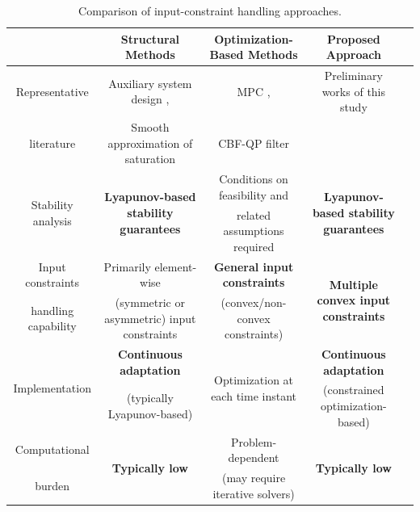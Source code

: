 \documentclass[letterpaper, journal]{IEEEtran}
\begin{document}


\begin{table}[t]
  \renewcommand{\arraystretch}{1.3}
  \caption{
    Comparison of input-constraint handling approaches.
  }
  \centering
  \begin{tabular}{c c c c c }
  \hline
  & 
  \textbf{Structural Methods} 
  & 
  \textbf{Optimization-Based Methods} 
  & 
  \textbf{Proposed Approach}
  \\
  \hline
  \hline %
    Representative 
  & 
  Auxiliary system design \cite{Gao:2017aa,Ma:2025aa,Gao:2026aa,Yang:2021aa,Jia:2020aa,Liu:2024aa,Liu:2025aa,Esfandiari:2014aa,Esfandiari:2015aa,Yu:2022aa,Rezaei:2025aa,He:2016aa,He:2019aa,Zhao:2016aa,Peng:2020aa},
  &
  MPC \cite{Greune:2011aa,Bemporad:1999aa,Berberich:2025aa,Draeger:1995aa,Vahidi-Moghaddam:2025aa,Mallick:2025aa,Khodaverdian:2025aa},
  &
  Preliminary works of this study
  \\
  literature
  &
  Smooth approximation of saturation \cite{Wang:2013aa,Cui:2014aa,Li:2024aa}
  &
  CBF-QP filter \cite{Ames:2019aa,Ko:2025aa,Sweatland:2025aa}
  &
  \cite{Ryu:2025ab,Ryu:2025aa}
  \\
  \hline %
  \multirow{2}{*}{
    Stability analysis 
  }
  & 
  \multirow{2}{*}{
    \textbf{Lyapunov-based stability guarantees}
  }
  & 
  Conditions on feasibility and
  & 
  \multirow{2}{*}{
    \textbf{Lyapunov-based stability guarantees}
  }
  \\
  &
  &
  related assumptions required
  &
  \\
  \hline %
  Input constraints 
  & 
  Primarily element-wise 
  & 
  \textbf{General input constraints}
  &
  \multirow{2}{*}{
  \textbf{Multiple convex input constraints}
  }
  \\
  handling capability
  &
  (symmetric or asymmetric) input constraints
  &
  (convex/non-convex constraints)
  &
  \\
  \hline %
  \multirow{2}{*}{
    Implementation
  }
  &
    \textbf{Continuous adaptation}
  &
  \multirow{2}{*}{
    Optimization at each time instant
  }
  &
    \textbf{Continuous adaptation}
  \\
  &
  (typically Lyapunov-based)
  &
  &
  (constrained optimization-based)
  \\
  \hline
    Computational
  &
  \multirow{2}{*}{
    \textbf{Typically low}
  }
  &
  Problem-dependent
  &
  \multirow{2}{*}{
    \textbf{Typically low}
  }
  \\
  burden
  &
  &
  (may require iterative solvers)
  &
  \\
  \hline
  \end{tabular}
  \label{table:intro:comparison}
\end{table}
\end{document}
